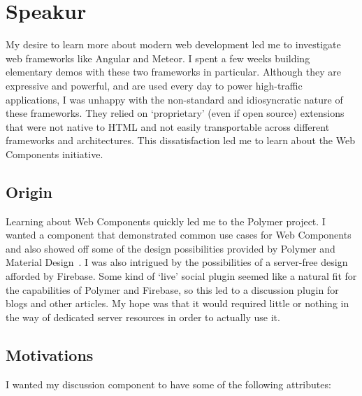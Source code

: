 \section{Speakur}
My desire to learn more about modern web development led me to investigate web frameworks like Angular and Meteor.
I spent a few weeks building elementary demos with these two frameworks in particular.
Although they are expressive and powerful, and are used every day to power high-traffic applications, 
I was unhappy with the non-standard and idiosyncratic nature of these frameworks. 
They relied on `proprietary' (even if open source) extensions that were not native to HTML and not easily transportable across different frameworks and architectures.
This dissatisfaction led me to learn about the Web Components initiative.

\subsection{Origin}
Learning about Web Components quickly led me to the Polymer project.
I wanted a component that demonstrated common use cases for Web Components and also showed off some of the design possibilities provided by Polymer and 
Material Design~\cite{imura2015}.
I was also intrigued by the possibilities of a server-free design afforded by Firebase.
Some kind of `live' social plugin seemed like a natural fit for the capabilities of Polymer and Firebase, so this led to a discussion plugin for blogs and other articles.
My hope was that it would required little or nothing in the way of dedicated server resources in order to actually use it. 

\subsection{Motivations}

I wanted my discussion component to have some of the following attributes:

